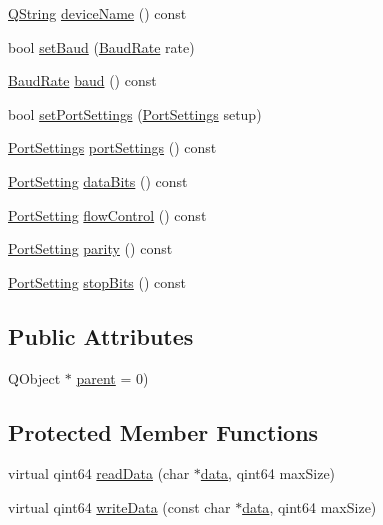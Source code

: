 \begin{DoxyCompactItemize}
\item 
\hyperlink{group___u_a_v_objects_plugin_gab9d252f49c333c94a72f97ce3105a32d}{Q\-String} \hyperlink{class_qxt_serial_device_a76a6cb9da9ee2944c61c1b149ee1301c}{device\-Name} () const 
\item 
bool \hyperlink{class_qxt_serial_device_af62f8fb4e0e4ed77fe6223ef6e1197bb}{set\-Baud} (\hyperlink{class_qxt_serial_device_ad433242c52b779e5c88e10a456070ddc}{Baud\-Rate} rate)
\item 
\hyperlink{class_qxt_serial_device_ad433242c52b779e5c88e10a456070ddc}{Baud\-Rate} \hyperlink{class_qxt_serial_device_a78a0d3825ef73a35a461f4ccbf5917ac}{baud} () const 
\item 
bool \hyperlink{class_qxt_serial_device_af1375c347c7a0482ff232fd770140e64}{set\-Port\-Settings} (\hyperlink{struct_port_settings}{Port\-Settings} setup)
\item 
\hyperlink{struct_port_settings}{Port\-Settings} \hyperlink{class_qxt_serial_device_a82470d59e4eae7ea3f0ae0f1cdedc7e5}{port\-Settings} () const 
\item 
\hyperlink{class_qxt_serial_device_aefe4c3cf41454d4595db50e03c4103da}{Port\-Setting} \hyperlink{class_qxt_serial_device_a6b6c4fcd7e297ccd60b4739bfe1848f5}{data\-Bits} () const 
\item 
\hyperlink{class_qxt_serial_device_aefe4c3cf41454d4595db50e03c4103da}{Port\-Setting} \hyperlink{class_qxt_serial_device_a32351c9f4f201951821879dc43b7d11d}{flow\-Control} () const 
\item 
\hyperlink{class_qxt_serial_device_aefe4c3cf41454d4595db50e03c4103da}{Port\-Setting} \hyperlink{class_qxt_serial_device_a62a0eacbba958cbad9d3a15edf103048}{parity} () const 
\item 
\hyperlink{class_qxt_serial_device_aefe4c3cf41454d4595db50e03c4103da}{Port\-Setting} \hyperlink{class_qxt_serial_device_aab2f7283b077ea1e8891a1cdc0d9c3ef}{stop\-Bits} () const 
\end{DoxyCompactItemize}
\subsection*{Public Attributes}
\begin{DoxyCompactItemize}
\item 
Q\-Object $\ast$ \hyperlink{class_qxt_serial_device_a0323aeafb6ee88ae1e3d2425972de5d1}{parent} = 0)
\end{DoxyCompactItemize}
\subsection*{Protected Member Functions}
\begin{DoxyCompactItemize}
\item 
virtual qint64 \hyperlink{class_qxt_serial_device_a39a1fc36ef55793cd5b4696acdce144b}{read\-Data} (char $\ast$\hyperlink{glext_8h_a8850df0785e6fbcc2351af3b686b8c7a}{data}, qint64 max\-Size)
\item 
virtual qint64 \hyperlink{class_qxt_serial_device_adc63a40850e19fb43e8f417f071ccf99}{write\-Data} (const char $\ast$\hyperlink{glext_8h_a8850df0785e6fbcc2351af3b686b8c7a}{data}, qint64 max\-Size)
\end{DoxyCompactItemize}


